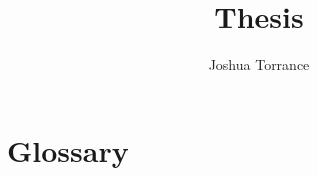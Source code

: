 \documentclass[11pt]{report}
\begin{document}
\title{Thesis}

\author{Joshua Torrance}

\maketitle






\tableofcontents



\appendix
\chapter{Glossary}
\printglossary


\renewcommand\bibname{References}

\end{document}
